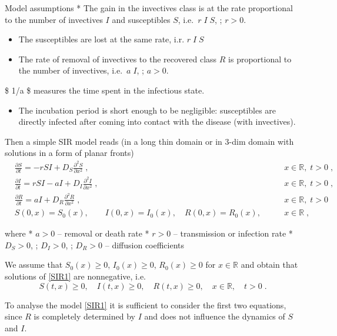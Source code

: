 \documentclass[
  letterpaper,
  DIV=11,
  numbers=noendperiod]{scrreprt}
\providecommand{\tightlist}{%
  \setlength{\itemsep}{0pt}\setlength{\parskip}{0pt}}\usepackage{longtable,booktabs,array}
\theoremstyle{plain}
\theoremstyle{definition}
\theoremstyle{plain}
\theoremstyle{remark}
\begin{document}
Model assumptions * The gain in the invectives class is at the rate
proportional to the number of invectives \(I\) and susceptibles \(S\),
i.e.~\(r\; I\; S\), ; \(r>0\).

\begin{itemize}
\tightlist
\item
  The susceptibles are lost at the same rate, i.r. \(r\; I\; S\)

  \item

  The rate of removal of invectives to the recovered class \(R\) is
  proportional to the number of invectives, i.e.~\(a\; I\), ; \(a>0\).
\end{itemize}

\$ 1/a \$ measures the time spent in the infectious state.

\begin{itemize}
\tightlist
\item
  The incubation period is short enough to be negligible: susceptibles
  are directly infected after coming into contact with the disease (with
  invectives).
\end{itemize}

Then a simple SIR model reads (in a long thin domain or in \(3\)-dim
domain with solutions in a form of planar fronts) \[
\begin{aligned}
&\frac{\partial S}{\partial t} = - r SI + D_S \frac{ \partial^2 S}{\partial x^2}\; ,  &\qquad x \in \mathbb R , \; t>0 \; , \\
&\frac{\partial I}{\partial t} = r SI - a I+ D_I \frac{ \partial^2 I}{\partial x^2} \; ,  &\qquad x \in \mathbb R , \; t>0 \; , \\
&\frac{\partial R}{\partial t} = a I + D_R \frac{ \partial^2 R}{\partial x^2} \; , & \qquad x \in \mathbb R , \; t>0 \; \\
&S(0,x) = S_0(x), \qquad I(0,x) = I_0(x), \quad R(0,x) = R_0(x),& \qquad x \in \mathbb R \; , 
\end{aligned}
\]

where * \(a>0\) -- removal or death rate * \(r>0\) -- transmission or
infection rate * \(D_S>0\), ; \(D_I>0\), ; \(D_R>0\) -- diffusion
coefficients

We assume that \(S_0(x) \geq 0\), \(I_0(x) \geq 0\), \(R_0(x) \geq 0\)
for \(x \in \mathbb R\) and obtain that solutions of \eqref{SIR1} are
nonnegative, i.e.~ \[
S(t,x) \geq 0, \quad I(t,x) \geq 0, \quad R(t,x) \geq 0, \quad  x\in \mathbb R, \quad t >0 \; .
\]

To analyse the model \eqref{SIR1} it is sufficient to consider the first
two equations, since \(R\) is completely determined by \(I\) and does
not influence the dynamics of \(S\) and \(I\).
\end{document}
